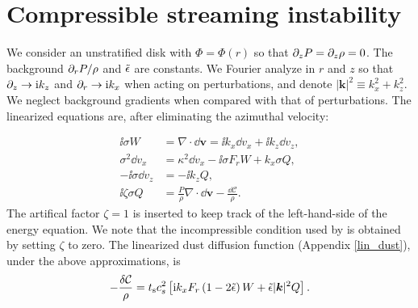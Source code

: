 \section{Compressible streaming instability}\label{compressible_streaming}
We consider an unstratified disk with $\Phi = \Phi (r)$ so that $\partial_zP = \partial_z\rho =
0$. The background $\partial_rP/\rho$ and $\tilde{\epsilon}$ are constants. 
We Fourier analyze in $r$ and $z$ so that $\partial_z\to \mathrm{i} k_z$ and
$\partial_r\to \mathrm{i} k_x$ when acting on perturbations, and denote $|\bm{k}|^2
\equiv k_x^2 + k_z^2$. We neglect 
background gradients when compared with that of perturbations. The linearized
equations are, after eliminating the azimuthal velocity: 

\begin{align}
  \ii \sigma W &=\nabla\cdot \bm{\dd v} = \ii k_x \dd v_x + \ii k_z \dd v_z,\\
    \sigma^2 \dd v_x &= \kappa^2 \dd v_x - \ii \sigma F_r W +
    k_x\sigma Q,\\
  -\ii\sigma\dd v_z &= -\ii k_zQ,\\
\ii \zeta \sigma  Q & = \frac{P}{\rho} \nabla \cdot \bm{\dd v}   -
  \frac{\dd \mathcal{C}}{\rho}. 
\end{align}
The artifical factor $\zeta = 1$  is inserted to keep track of the
left-hand-side of the energy equation. We note that the incompressible
condition used by \cite{jacquet11} is obtained by setting $\zeta$ to zero. 
The linearized dust diffusion
function (Appendix \ref{lin_dust}), 
under the above approximations, is 
\begin{align}
-\frac{\delta \mathcal{C}}{\rho}  = t_\mathrm{s} c_s^2 \left[\mathrm{i} k_x F_r\left( 1-2\tilde{\epsilon}\right)
  W + \tilde{\epsilon} |\bm{k}|^2 Q\right]. 
\end{align}

